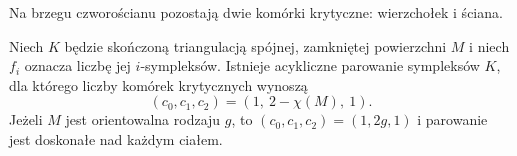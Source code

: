 \begin{samepage}
\begin{center}
\begin{minipage}{.96\linewidth}\centering
{}\par\smallskip

{\footnotesize Na brzegu czworościanu pozostają dwie komórki
krytyczne: wierzchołek i ściana.}
\end{minipage}
\end{center}
\end{samepage}

\begin{twierdzenie}
\label{thm:tg-forman-tree-cotree}
Niech $K$ będzie skończoną triangulacją spójnej,
zamkniętej powierzchni $M$ i niech $f_i$ oznacza
liczbę jej $i$-sympleksów. Istnieje acykliczne
parowanie sympleksów $K$, dla którego liczby
komórek krytycznych wynoszą
\[
(c_0,c_1,c_2)=(1,\ 2-\chi(M),\ 1).
\]
Jeżeli $M$ jest orientowalna rodzaju $g$, to
$(c_0,c_1,c_2)=(1,2g,1)$ i parowanie jest
doskonałe nad każdym ciałem.
\end{twierdzenie}

